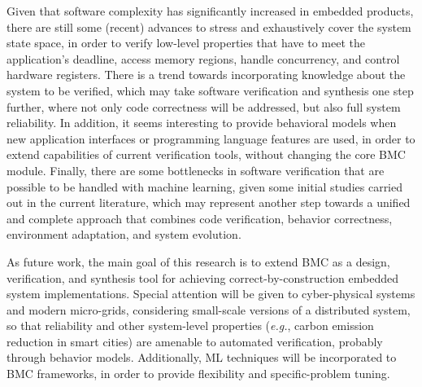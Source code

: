 \documentclass[format=acmsmall, review=false, screen=true]{acmart}
\begin{document}
{{Given that software complexity has significantly increased in embedded products, there are still some (recent) advances to stress and exhaustively cover the system state space, in order to verify low-level properties that have to meet the application's deadline, access memory regions, handle concurrency, and control hardware registers. There is a trend towards incorporating knowledge about the system to be verified, which may take software verification and synthesis one step further, where not only code correctness will be addressed, but also full system reliability. In addition, it seems interesting to provide behavioral models when new application interfaces or programming language features are used, in order to extend capabilities of current verification tools, without changing the core BMC module. Finally, there are some bottlenecks in software verification that are possible to be handled with machine learning, given some initial studies carried out in the current literature, which may represent another step towards a unified and complete approach that combines code verification, behavior correctness, environment adaptation, and system evolution.

As future work, the main goal of this research is to extend BMC as a design, verification, and synthesis tool for achieving correct-by-construction embedded system implementations. Special attention will be given to cyber-physical systems and modern micro-grids, considering small-scale versions of a distributed system, so that reliability and other system-level properties ({\it e.g.}, carbon emission reduction in smart cities) are amenable to automated verification, probably through behavior models. Additionally, ML techniques will be incorporated to BMC frameworks, in order to provide flexibility and specific-problem tuning.











}}
\end{document}
